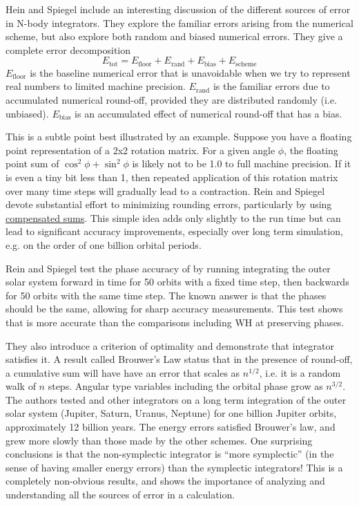 Hein and Spiegel include an interesting discussion of the different sources of error in N-body integrators.
They explore the familiar errors arising from the numerical scheme, 
but also explore both random and biased numerical errors.
They give a complete error decomposition
$$E_{\text{tot}} = E_{\text{floor}} + E_{\text{rand}} + E_{\text{bias}} + E_{\text{scheme}}$$
$E_{\text{floor}}$ is the baseline numerical error that is unavoidable when we try to represent
real numbers to limited machine precision.
$E_{\text{rand}}$ is the familiar errors due to accumulated numerical round-off, 
provided they are distributed randomly (i.e. unbiased).  
$E_{\text{bias}}$ is an accumulated effect of numerical round-off that has a bias.

This is a subtle point best illustrated by an example.
Suppose you have a floating point representation of a 2x2 rotation matrix.
For a given angle $\phi$, the floating point sum of $\cos^2\phi + \sin^2\phi$
is likely not to be 1.0 to full machine precision.  
If it is even a tiny bit less than 1, then repeated application of this rotation matrix
over many time steps will gradually lead to a contraction.
Rein and Spiegel devote substantial effort to minimizing rounding errors, 
particularly by using \href{https://en.wikipedia.org/wiki/Kahan_summation_algorithm}{compensated sums}.
This simple idea adds only slightly to the run time but can lead to significant accuracy improvements,
especially over long term simulation, e.g. on the order of one billion orbital periods.

Rein and Spiegel test the phase accuracy of  by running integrating the 
outer solar system forward in time for 50 orbits with a fixed time step,
then backwards for 50 orbits with the same time step.
The known answer is that the phases should be the same, allowing for sharp accuracy measurements.
This test shows that  is more accurate than the comparisons including WH at preserving phases.

They also introduce a criterion of optimality and demonstrate that  integrator satisfies it.
A result called Brouwer's Law status that in the presence of round-off, 
a cumulative sum will have have an error that scales as $n^{1/2}$, i.e. it is a random walk of $n$ steps.
Angular type variables including the orbital phase grow as $n^{3/2}$.
The authors tested  and other integrators on a long term integration of the outer solar system
(Jupiter, Saturn, Uranus, Neptune) for one billion Jupiter orbits, approximately 12 billion years.
The energy errors satisfied Brouwer's law, and grew more slowly than those made by the other schemes.
One surprising conclusions is that the non-symplectic  integrator is ``more symplectic''
(in the sense of having smaller energy errors) than the symplectic integrators!
This is a completely non-obvious results, and shows the importance of analyzing and understanding
all the sources of error in a calculation.
